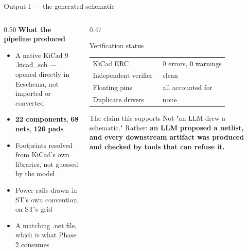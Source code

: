 \documentclass[aspectratio=169,10pt]{beamer}
\newcommand{\ok}{{\color{stgreen}\textbf{\checkmark}}}
\newcommand{\code}[1]{{\ttfamily\small #1}}
\begin{document}
\begin{frame}{Output 1 --- the generated schematic}
\vspace{1mm}
\begin{columns}[T]
\begin{column}{0.50\textwidth}
\textbf{What the pipeline produced}
\begin{itemize}\small
  \item A native KiCad 9 \code{.kicad\_sch} --- opened directly in Eeschema, not imported or converted
  \item \textbf{22 components}, \textbf{68 nets}, \textbf{126 pads}
  \item Footprints resolved from KiCad's own libraries, not guessed by the model
  \item Power rails drawn in ST's own convention, on ST's grid
  \item A matching \code{.net} file, which is what Phase 2 consumes
\end{itemize}
\end{column}
\begin{column}{0.47\textwidth}
\begin{block}{Verification status}
\small
\begin{tabular}{@{}l l@{}}
KiCad ERC & \ok\ 0 errors, 0 warnings\\
Independent verifier & \ok\ clean\\
Floating pins & \ok\ all accounted for\\
Duplicate drivers & \ok\ none\\
\end{tabular}
\end{block}
\vspace{1mm}
\begin{block}{The claim this supports}
\small
Not "an LLM drew a schematic." Rather: \textbf{an LLM proposed a netlist, and every downstream artifact was produced and checked by tools that can refuse it.}
\end{block}
\end{column}
\end{columns}
\end{frame}
\end{document}
